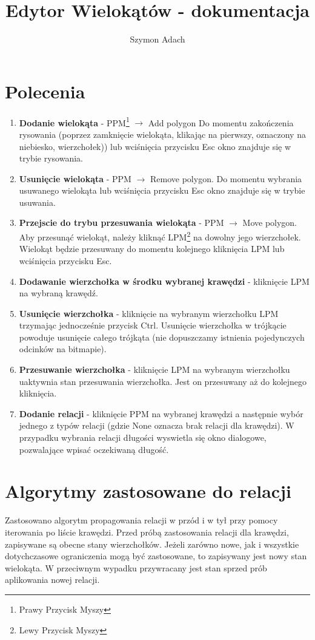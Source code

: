 \documentclass[]{article}
\title{Edytor Wielokątów - dokumentacja}
\author{Szymon Adach}
\begin{document}
\maketitle

\section{Polecenia}
\begin{enumerate}
	\item \textbf{Dodanie wielokąta} - PPM\footnote{Prawy Przycisk Myszy} $\rightarrow$ Add polygon \newline
	Do momentu zakończenia rysowania (poprzez zamknięcie wielokąta, klikając na pierwszy, oznaczony na niebiesko, wierzchołek)) lub wciśnięcia przycisku Esc okno znajduje się w trybie rysowania.
	\item \textbf{Usunięcie wielokąta} - PPM $\rightarrow$ Remove polygon.
	Do momentu wybrania usuwanego wielokąta lub wciśnięcia przycisku Esc okno znajduje się w trybie usuwania.
	\item \textbf{Przejscie do trybu przesuwania wielokąta} - PPM $\rightarrow$ Move polygon. \newline
	Aby przesunąć wielokąt, należy kliknąć LPM\footnote{Lewy Przycisk Myszy} na dowolny jego wierzchołek. Wielokąt będzie przesuwany do momentu kolejnego kliknięcia LPM lub wciśnięcia przycisku Esc.
	\item \textbf{Dodawanie wierzchołka w środku wybranej krawędzi} - kliknięcie LPM na wybraną krawędź.
	\item \textbf{Usunięcie wierzchołka} - kliknięcie na wybranym wierzchołku LPM trzymając jednocześnie przycisk Ctrl. Usunięcie wierzchołka w trójkącie powoduje usunięcie całego trójkąta (nie dopuszczamy istnienia pojedynczych odcinków na bitmapie).
	\item \textbf{Przesuwanie wierzchołka} - kliknięcie LPM na wybranym wierzchołku uaktywnia stan przesuwania wierzchołka. Jest on przesuwany aż do kolejnego kliknięcia.
	\item \textbf{Dodanie relacji} - kliknięcie PPM na wybranej krawędzi a następnie wybór jednego z typów relacji (gdzie None oznacza brak relacji dla krawędzi). W przypadku wybrania relacji długości wyswietla się okno dialogowe, pozwalające wpisać oczekiwaną długość.
\end{enumerate}
\section{Algorytmy zastosowane do relacji}
Zastosowano algorytm propagowania relacji w przód i w tył przy pomocy iterowania po liście krawędzi. Przed próbą zastosowania relacji dla krawędzi, zapisywane są obecne stany wierzchołków. Jeżeli zarówno nowe, jak i wszystkie dotychczasowe ograniczenia mogą być zastosowane, to zapisywany jest nowy stan wielokąta. W przeciwnym wypadku przywracany jest stan sprzed prób aplikowania nowej relacji.
\end{document}

